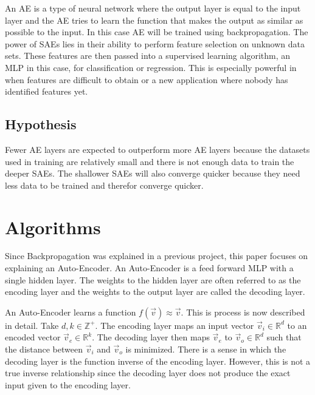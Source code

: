 \documentclass[twoside,11pt]{article}
\begin{document}
	An AE is a type of neural network where the output layer is equal to the input layer and the AE tries to learn the function that makes the output as similar as possible to the input. In this case AE will be trained using backpropagation. The power of SAEs lies in their ability to perform feature selection on unknown data sets. These features are then passed into a supervised learning algorithm, an MLP in this case, for classification or regression. This is especially powerful in when features are difficult to obtain or a new application where nobody has identified features yet. 
	
	

\subsection{Hypothesis}
	Fewer AE layers are expected to outperform more AE layers because the datasets used in training are relatively small and there is not enough data to train the deeper SAEs. The shallower SAEs will also converge quicker because they need less data to be trained and therefor converge quicker. 
\section{Algorithms}

	Since Backpropagation was explained in a previous project, this paper focuses on explaining an Auto-Encoder. 
	An Auto-Encoder is a feed forward MLP with a single hidden layer. 
	The weights to the hidden layer are often referred to as the encoding layer and the weights to the output layer are called the decoding layer. 
	
	An Auto-Encoder learns a function $f(\vec{v}) \approx \vec{v}$. 
	This is process is now described in detail.
	Take $d,k \in \mathbb{Z}^+$. 
	The encoding layer maps an input vector $\vec{v}_i \in \mathbb{R}^d$ to an encoded vector $\vec{v}_e \in \mathbb{R}^k$.
	The decoding layer then maps $\vec{v}_e$ to $\vec{v}_o \in \mathbb{R}^d$ such that the distance between $\vec{v}_i$ and $\vec{v}_o$ is minimized.
	There is a sense in which the decoding layer is the function inverse of the encoding layer. 
	However, this is not a true inverse relationship since the decoding layer does not produce the exact input given to the encoding layer.
	
\end{document}
